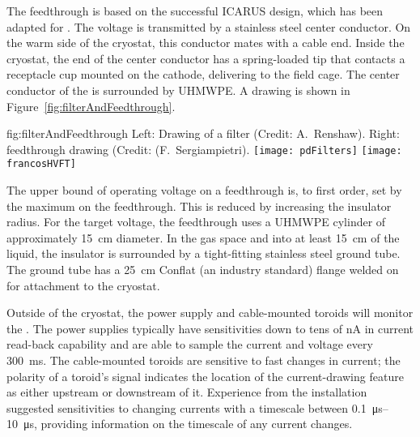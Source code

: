 The  feedthrough %
is based on the successful ICARUS design,  which has been adapted for .  The voltage is transmitted by a stainless steel center conductor.  On the warm side of the cryostat, this conductor mates with a cable end.  Inside the cryostat, the end of the center conductor has a spring-loaded tip that %
contacts a receptacle cup mounted on the cathode, delivering  to the field cage.  The center conductor of the \fdth is surrounded by UHMWPE. A drawing is shown in Figure~\ref{fig:filterAndFeedthrough}.

\begin{dunefigure}{fig:filterAndFeedthrough}
{Left:  Drawing of a  filter (Credit:  A.~Renshaw). Right:   feedthrough drawing (Credit:  (F.~Sergiampietri).}
\texttt{[image: pdFilters]}
\texttt{[image: francosHVFT]}
\end{dunefigure}

The upper bound of operating voltage on a feedthrough is, to first order, set by the maximum \efield{} on the feedthrough.  This \efield{} is reduced by increasing the insulator radius.  For the target voltage, the feedthrough uses a UHMWPE cylinder of approximately \SI{15}{cm} diameter.  In the gas space and into at least \SI{15}{\centi\meter} of the liquid, the insulator is surrounded by a tight-fitting stainless steel ground tube.  The ground tube has a \SI{25}{\centi\meter}  Conflat (an industry standard) flange  welded on for attachment to the cryostat.


Outside of the cryostat, the  power supply and cable-mounted toroids will monitor the .    The power supplies %
typically have sensitivities down to tens of \si{\nano\ampere} in current read-back capability 
 and are able to sample the current and voltage every \SI{300}{\ms}.  The cable-mounted toroids are sensitive to fast changes in current; %
the polarity of a toroid's signal %
indicates the location of the current-drawing feature as either upstream or downstream of it.  Experience from the  installation suggested sensitivities to changing currents with a timescale between \SIrange{0.1}{10}{\micro\s}, providing information on the timescale of any current changes.

